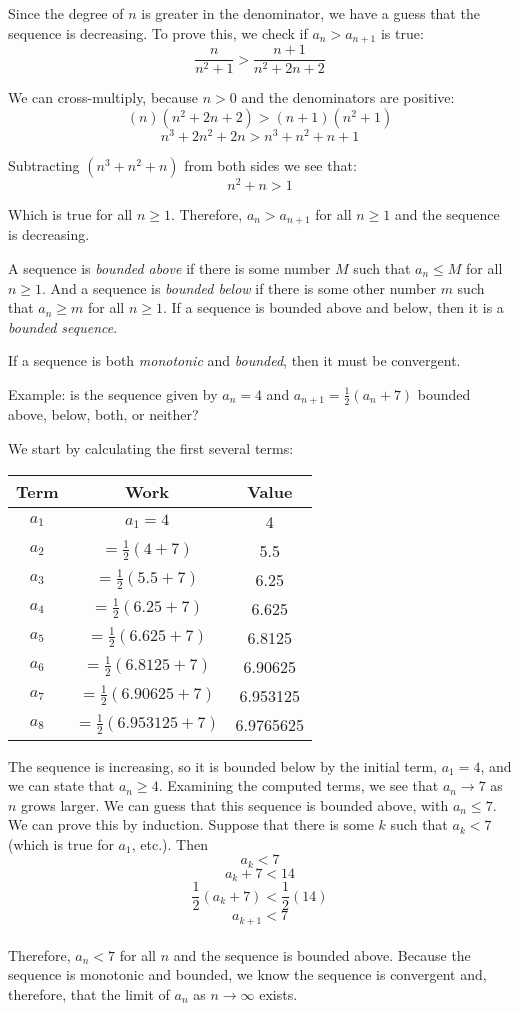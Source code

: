 Since the degree of $n$ is greater in the denominator, we have a guess 
that the sequence is decreasing. To prove this, we check if $a_n > 
a_{n+1}$ is true:
$$\frac{n}{n^2 + 1} > \frac{n + 1}{n^2 + 2n + 2}$$

We can cross-multiply, because $n > 0$ and the denominators are 
positive:
$$(n)(n^2 + 2n + 2) > (n+1)(n^2 + 1)$$
$$n^3 + 2n^2 + 2n > n^3 + n^2 + n + 1$$

Subtracting $(n^3 + n^2 + n)$ from both sides we see that:
$$n^2 + n > 1$$

Which is true for all $n \geq1$. Therefore, $a_n > a_{n+1}$ for all 
$n \geq 1$ and the sequence is decreasing. 

A sequence is \textit{bounded above} if there is some number $M$ such 
that $a_n \leq M$ for all $n \geq 1$. And a sequence is 
\textit{bounded below} if there is some other number $m$ such that 
$a_n \geq m$ for all $n \geq 1$. If a sequence is bounded above and 
below, then it is a \textit{bounded sequence}. 

If a sequence is both \textit{monotonic} and \textit{bounded}, then it 
must be convergent. 

Example: is the sequence given by $a_n = 4$ and $a_{n+1} = \frac{1}{2}
(a_n + 7)$ bounded above, below, both, or neither?

We start by calculating the first several terms:
\begin{center}
	\begin{tabular}{|c|c|c|}\hline
	Term & Work & Value\\
	\hline
	$a_1$ & $a_1 = 4$ & 4\\
	\hline
	$a_2$ & $=\frac{1}{2}(4 + 7)$ & 5.5\\
	\hline
	$a_3$ & $=\frac{1}{2}(5.5+7)$ & 6.25\\
	\hline
	$a_4$ & $=\frac{1}{2}(6.25+7)$ & 6.625\\
	\hline
	$a_5$ & $=\frac{1}{2}(6.625+7)$ & 6.8125\\
	\hline
	$a_6$ & $=\frac{1}{2}(6.8125+7)$ & 6.90625\\
	\hline
	$a_7$ & $=\frac{1}{2}(6.90625+7)$ & 6.953125\\
	\hline
	$a_8$ & $=\frac{1}{2}(6.953125+7)$ & 6.9765625\\
	\hline	
	\end{tabular}
\end{center}

The sequence is increasing, so it is bounded below by the initial 
term, $a_1 = 4$, and we can state that $a_n \geq 4$. Examining the 
computed terms, we see that $a_n \to 7$ as $n$ grows larger. We can 
guess that this sequence is bounded above, with $a_n \leq 7$. We can 
prove this by induction. Suppose that there is some $k$ such that 
$a_k < 7$ (which is true for $a_1$, etc.). Then
$$a_k < 7$$
$$a_k + 7 < 14$$
$$\frac{1}{2}(a_k + 7) < \frac{1}{2}(14)$$
$$a_{k + 1} < 7$$\\
Therefore, $a_n < 7$ for all $n$ and the sequence is bounded above. 
Because the sequence is monotonic and bounded, we know the sequence 
is convergent and, therefore, that the limit of $a_n$ as $n \to 
\infty$ exists. 

